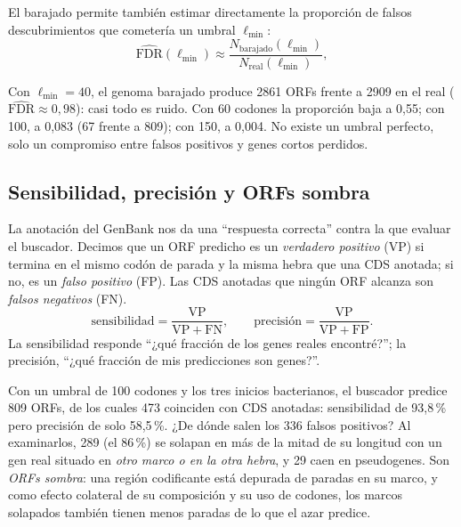 El barajado permite también estimar directamente la proporción de falsos descubrimientos que cometería un umbral $\ell_{\min}$:
\begin{equation}\label{eq:01-fdr}
\widehat{\mathrm{FDR}}(\ell_{\min}) \approx \frac{N_{\text{barajado}}(\ell_{\min})}{N_{\text{real}}(\ell_{\min})},
\end{equation}

\begin{simbolos}
\end{simbolos}

Con $\ell_{\min}=40$, el genoma barajado produce \num{2861} ORFs frente a \num{2909} en el real ($\widehat{\mathrm{FDR}}\approx0{,}98$): casi todo es ruido. Con 60 codones la proporción baja a 0,55; con 100, a 0,083 (67 frente a 809); con 150, a 0,004. No existe un umbral perfecto, solo un compromiso entre falsos positivos y genes cortos perdidos.

\subsection{Sensibilidad, precisión y ORFs sombra}

La anotación del GenBank nos da una ``respuesta correcta'' contra la que evaluar el buscador. Decimos que un ORF predicho es un \emph{verdadero positivo} (VP) si termina en el mismo codón de parada y la misma hebra que una CDS anotada; si no, es un \emph{falso positivo} (FP). Las CDS anotadas que ningún ORF alcanza son \emph{falsos negativos} (FN).
\begin{equation}\label{eq:01-metricas}
\text{sensibilidad} = \frac{\mathrm{VP}}{\mathrm{VP}+\mathrm{FN}},\qquad
\text{precisión} = \frac{\mathrm{VP}}{\mathrm{VP}+\mathrm{FP}} .
\end{equation}
La sensibilidad responde ``¿qué fracción de los genes reales encontré?''; la precisión, ``¿qué fracción de mis predicciones son genes?''.

Con un umbral de 100 codones y los tres inicios bacterianos, el buscador predice 809 ORFs, de los cuales 473 coinciden con CDS anotadas: sensibilidad de 93,8\,\% pero precisión de solo 58,5\,\%. ¿De dónde salen los 336 falsos positivos? Al examinarlos, 289 (el 86\,\%) se solapan en más de la mitad de su longitud con un gen real situado en \emph{otro marco o en la otra hebra}, y 29 caen en pseudogenes. Son \emph{ORFs sombra}: una región codificante está depurada de paradas en su marco, y como efecto colateral de su composición y su uso de codones, los marcos solapados también tienen menos paradas de lo que el azar predice.

